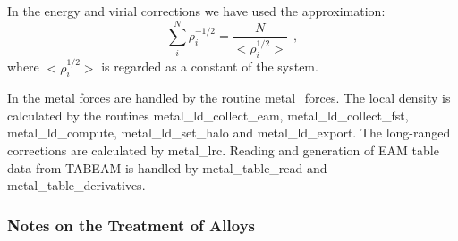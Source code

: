 In the energy and virial corrections we have used the approximation:
\begin{equation}
\sum_{i}^{N}\rho_{i}^{-1/2} = \frac{N}{<\rho_{i}^{1/2}>}~~,
\end{equation}
where $<\rho_{i}^{1/2}>$ is regarded as a constant of the system.

In \D the metal forces are handled by the routine {\sc
metal\_forces}.  The local density is calculated by the routines
{\sc metal\_ld\_collect\_eam}, {\sc metal\_ld\_collect\_fst},
{\sc metal\_ld\_compute}, {\sc metal\_ld\_set\_halo} and
{\sc metal\_ld\_export}.  The long-ranged corrections are calculated by
{\sc metal\_lrc}.  Reading and generation of EAM table data from TABEAM
is handled by {\sc metal\_table\_read} and {\sc metal\_table\_derivatives}.

\subsubsection*{Notes on the Treatment of Alloys}

